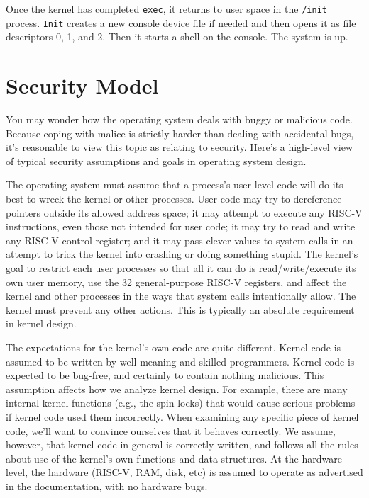 Once the kernel has completed 
\lstinline{exec},
it returns to user space in
the \lstinline{/init} process.
\lstinline{Init}
creates a new console device file
if needed
and then opens it as file descriptors 0, 1, and 2.
Then it starts a shell on the console.
The system is up.

\section{Security Model}

You may wonder how the operating system deals with buggy or malicious
code. Because coping with malice is strictly harder than dealing with
accidental bugs, it's reasonable to view this topic as relating to
security. Here's a high-level view of typical security assumptions and
goals in operating system design.

The operating system must assume that a process's user-level code will
do its best to wreck the kernel or other processes. User code may try
to dereference pointers outside its allowed address space; it may
attempt to execute any RISC-V instructions, even those not intended
for user code; it may try to read and write any RISC-V control
register; and it may pass clever values to system calls in an attempt
to trick the kernel into crashing or doing something stupid. The
kernel's goal to restrict each user processes so that all it can do is
read/write/execute its own user memory, use the 32 general-purpose
RISC-V registers, and affect the kernel and other processes in the
ways that system calls intentionally allow. The kernel must prevent
any other actions. This is typically an absolute requirement in kernel
design.

The expectations for the kernel's own code are quite different. Kernel
code is assumed to be written by well-meaning and skilled programmers.
Kernel code is expected to be bug-free, and certainly to contain
nothing malicious. This assumption affects how we analyze kernel
design. For example, there are many internal kernel functions (e.g.,
the spin locks) that would cause serious problems if kernel code used
them incorrectly. When examining any specific piece of kernel code,
we'll want to convince ourselves that it behaves correctly. We assume,
however, that kernel code in general is correctly written, and follows
all the rules about use of the kernel's own functions and data
structures. At the hardware level, the hardware (RISC-V, RAM, disk,
etc) is assumed to operate as advertised in the documentation, with no
hardware bugs.

